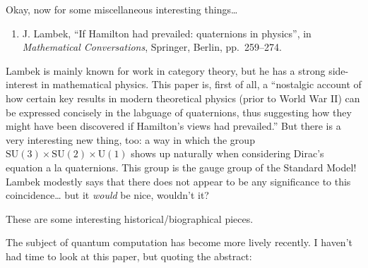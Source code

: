 \documentclass{article}
\def\tightlist{}
\renewcommand{\texttt}[1]{%
  \begingroup
  \ttfamily
  \begingroup\lccode`~=`/\lowercase{\endgroup\def~}{/\discretionary{}{}{}}%
  \begingroup\lccode`~=`[\lowercase{\endgroup\def~}{[\discretionary{}{}{}}%
  \begingroup\lccode`~=`.\lowercase{\endgroup\def~}{.\discretionary{}{}{}}%
  \catcode`/=\active\catcode`[=\active\catcode`.=\active
  \scantokens{#1\noexpand}%
  \endgroup
}
\begin{document}
Okay, now for some miscellaneous interesting things\ldots{}

\begin{enumerate}
\def\labelenumi{\arabic{enumi})}
\setcounter{enumi}{10}
\tightlist
\item
  J. Lambek, ``If Hamilton had prevailed: quaternions in physics'', 
in \emph{Mathematical Conversations}, Springer, Berlin, pp.\ 259--274.
\end{enumerate}
\noindent
Lambek is mainly known for work in category theory, but he has a strong
side-interest in mathematical physics. This paper is, first of all, a
``nostalgic account of how certain key results in modern theoretical
physics (prior to World War II) can be expressed concisely in the
labguage of quaternions, thus suggesting how they might have been
discovered if Hamilton's views had prevailed.'' But there is a very
interesting new thing, too: a way in which the group
\(\mathrm{SU}(3) \times \mathrm{SU}(2) \times \mathrm{U}(1)\) shows up
naturally when considering Dirac's equation a la quaternions. This group
is the gauge group of the Standard Model! Lambek modestly says that
there does not appear to be any significance to this coincidence\ldots{}
but it \emph{would} be nice, wouldn't it?


These are some interesting historical/biographical pieces.

\noindent
The subject of quantum computation has become more lively recently. I
haven't had time to look at this paper, but quoting the abstract:
\end{document}
